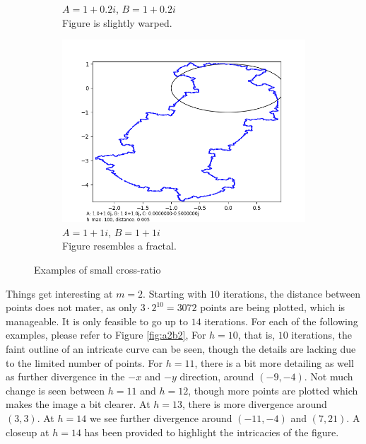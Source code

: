 \documentclass[12pt,a4paper,reqno,parskip=full]{amsart}
\numberwithin{equation}{section}
\theoremstyle{plain}
\theoremstyle{definition}
\begin{document}
\begin{figure}[H]
\begin{subfigure}[b]{0.4\textwidth}
         \caption{$A=1+0.2i$, $B=1+0.2i$\\Figure is slightly warped.}
         \label{fig:warped}
     \end{subfigure}
     \hfill
     \begin{subfigure}[b]{0.4\textwidth}
         \centering
         \includegraphics[width=\textwidth]{images/m/a1,b1,h100,d.005.png}
         \caption{$A=1+1i$, $B=1+1i$\\Figure resembles a fractal.}
         \label{fig:fractal}
     \end{subfigure}
        \caption{Examples of small cross-ratio}
        \label{fig:small CR}
\end{figure}

Things get interesting at $m=2$. Starting with $10$ iterations, the distance between points does not mater, as only $3\cdot2^{10}=3072$ points are being plotted, which is manageable. It is only feasible to go up to $14$ iterations. For each of the following examples, please refer to Figure \ref{fig:a2b2}, For $h=10$, that is, $10$ iterations, the faint outline of an intricate curve can be seen, though the details are lacking due to the limited number of points. For $h=11$, there is a bit more detailing as well as further divergence in the $-x$ and $-y$ direction, around $(-9,-4)$. Not much change is seen between $h=11$ and $h=12$, though more points are plotted which makes the image a bit clearer. At $h=13$, there is more divergence around $(3,3)$. At $h=14$ we see further divergence around $(-11,-4)$ and $(7,21)$. A closeup at $h=14$ has been provided to highlight the intricacies of the figure. 
\end{document}
